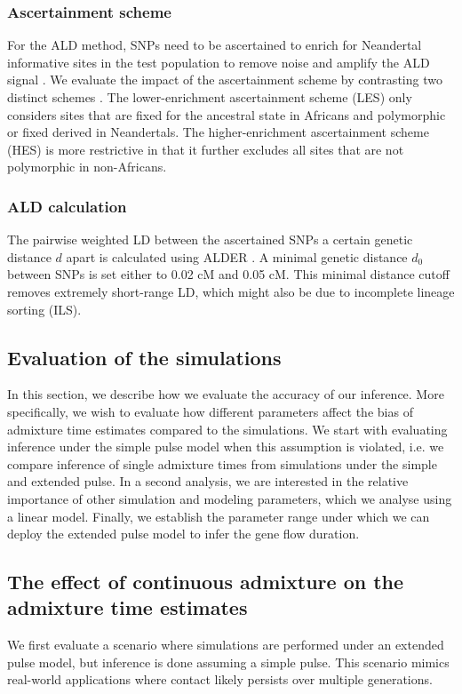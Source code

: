 \documentclass[]{article}
\begin{document}
\subsubsection{Ascertainment scheme}\label{asceteinment scheme}
For the ALD method, SNPs need to be ascertained to enrich for
Neandertal informative sites in the test population to remove noise and
amplify the ALD signal \citep{sankararaman_date_2012}. 
We evaluate the impact of the ascertainment scheme by contrasting two distinct schemes \citep{sankararaman_date_2012,fu_genome_2014}. The lower-enrichment ascertainment scheme (LES) only considers  sites that are fixed for the ancestral state in
Africans and polymorphic or fixed derived in Neandertals. The higher-enrichment
ascertainment scheme (HES) is more restrictive in that it further excludes all sites that are not polymorphic in non-Africans.

\subsubsection{ALD calculation}\label{ALD calculation}

The pairwise weighted LD between the ascertained SNPs a certain genetic
distance \(d\) apart is calculated using ALDER
\citep{loh_inferring_2013}. A minimal genetic distance \(d_0\) between
SNPs is set either to 0.02 cM and 0.05 cM. This minimal distance cutoff
removes extremely short-range LD, which might also be due to incomplete lineage sorting (ILS). 

\subsection{Evaluation of the simulations}

In this section, we describe how we evaluate the accuracy of our inference. More specifically, we wish to evaluate how different parameters affect the bias of admixture time estimates compared to the simulations. We start with evaluating inference under the simple pulse model when this assumption is violated, i.e. we compare inference of single admixture times from simulations under the simple and extended pulse. In a second analysis, we are interested in the relative importance of other simulation and modeling parameters, which we analyse using a linear model. Finally, we establish the parameter range under which we can deploy the extended pulse model to infer the gene flow duration.


\subsection{The effect of continuous admixture on the admixture time estimates}\label{the effect of continuous admixture on the admixture time estimates}
We first evaluate a scenario where simulations are performed under an extended pulse model, but inference is done assuming a simple pulse. This scenario mimics real-world applications where contact likely persists over multiple generations. 
\end{document}
